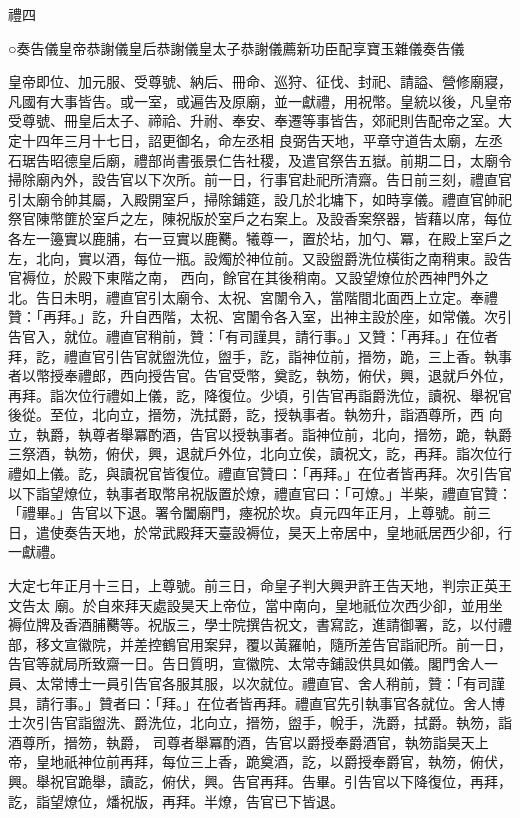 
\begin{pinyinscope}

 禮四



 ○奏告儀皇帝恭謝儀皇后恭謝儀皇太子恭謝儀薦新功臣配享寶玉雜儀奏告儀



 皇帝即位、加元服、受尊號、納后、冊命、巡狩、征伐、封祀、請謚、營修廟寢，凡國有大事皆告。或一室，或遍告及原廟，並一獻禮，用祝幣。皇統以後，凡皇帝受尊號、冊皇后太子、禘祫、升祔、奉安、奉遷等事皆告，郊祀則告配帝之室。大定十四年三月十七日，詔更御名，命左丞相
 良弼告天地，平章守道告太廟，左丞石琚告昭德皇后廟，禮部尚書張景仁告社稷，及遣官祭告五嶽。前期二日，太廟令掃除廟內外，設告官以下次所。前一日，行事官赴祀所清齋。告日前三刻，禮直官引太廟令帥其屬，入殿開室戶，掃除鋪筵，設几於北墉下，如時享儀。禮直官帥祀祭官陳幣篚於室戶之左，陳祝版於室戶之右案上。及設香案祭器，皆藉以席，每位各左一籩實以鹿脯，右一豆實以鹿臡。犧尊一，置於坫，加勺、冪，在殿上室戶之左，北向，實以酒，每位一瓶。設燭於神位前。又設盥爵洗位橫街之南稍東。設告官褥位，於殿下東階之南，
 西向，餘官在其後稍南。又設望燎位於西神門外之北。告日未明，禮直官引太廟令、太祝、宮闈令入，當階間北面西上立定。奉禮贊：「再拜。」訖，升自西階，太祝、宮闈令各入室，出神主設於座，如常儀。次引告官入，就位。禮直官稍前，贊：「有司謹具，請行事。」又贊：「再拜。」在位者拜，訖，禮直官引告官就盥洗位，盥手，訖，詣神位前，搢笏，跪，三上香。執事者以幣授奉禮郎，西向授告官。告官受幣，奠訖，執笏，俯伏，興，退就戶外位，再拜。詣次位行禮如上儀，訖，降復位。少頃，引告官再詣爵洗位，讀祝、舉祝官後從。至位，北向立，搢笏，洗拭爵，訖，授執事者。執笏升，詣酒尊所，西
 向立，執爵，執尊者舉冪酌酒，告官以授執事者。詣神位前，北向，搢笏，跪，執爵三祭酒，執笏，俯伏，興，退就戶外位，北向立俟，讀祝文，訖，再拜。詣次位行禮如上儀。訖，與讀祝官皆復位。禮直官贊曰：「再拜。」在位者皆再拜。次引告官以下詣望燎位，執事者取幣帛祝版置於燎，禮直官曰：「可燎。」半柴，禮直官贊：「禮畢。」告官以下退。署令闔廟門，瘞祝於坎。貞元四年正月，上尊號。前三日，遣使奏告天地，於常武殿拜天臺設褥位，昊天上帝居中，皇地祇居西少卻，行一獻禮。



 大定七年正月十三日，上尊號。前三日，命皇子判大興尹許王告天地，判宗正英王文告太
 廟。於自來拜天處設昊天上帝位，當中南向，皇地祇位次西少卻，並用坐褥位牌及香酒脯臡等。祝版三，學士院撰告祝文，書寫訖，進請御署，訖，以付禮部，移文宣徽院，并差控鶴官用案舁，覆以黃羅帕，隨所差告官詣祀所。前一日，告官等就局所致齋一日。告日質明，宣徽院、太常寺鋪設供具如儀。閣門舍人一員、太常博士一員引告官各服其服，以次就位。禮直官、舍人稍前，贊：「有司謹具，請行事。」贊者曰：「拜。」在位者皆再拜。禮直官先引執事官各就位。舍人博士次引告官詣盥洗、爵洗位，北向立，搢笏，盥手，帨手，洗爵，拭爵。執笏，詣酒尊所，搢笏，執爵，
 司尊者舉冪酌酒，告官以爵授奉爵酒官，執笏詣昊天上帝，皇地祇神位前再拜，每位三上香，跪奠酒，訖，以爵授奉爵官，執笏，俯伏，興。舉祝官跪舉，讀訖，俯伏，興。告官再拜。告畢。引告官以下降復位，再拜，訖，詣望燎位，燔祝版，再拜。半燎，告官已下皆退。




\end{pinyinscope}
